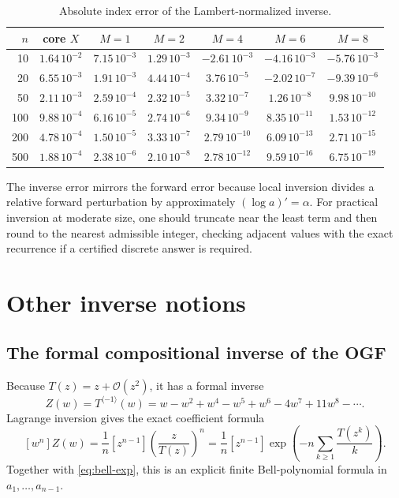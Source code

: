 \documentclass[11pt]{article}
\theoremstyle{definition}
\theoremstyle{remark}
\newcommand{\BigO}{\mathcal O}
\newcommand{\invcomp}{\langle-1\rangle}
\begin{document}
\begin{table}[htbp]
\centering
\caption{Absolute index error of the Lambert-normalized inverse.}
\label{tab:inverse-errors}
\scriptsize
\setlength{\tabcolsep}{4.6pt}
\begin{tabular}{rcccccc}
\toprule
$n$ & core $X$ & $M=1$ & $M=2$ & $M=4$ & $M=6$ & $M=8$\\
\midrule
10  & $ 1.64\,10^{-2}$ & $ 7.15\,10^{-3}$ & $ 1.29\,10^{-3}$ & $-2.61\,10^{-3}$ & $-4.16\,10^{-3}$ & $-5.76\,10^{-3}$\\
20  & $ 6.55\,10^{-3}$ & $ 1.91\,10^{-3}$ & $ 4.44\,10^{-4}$ & $ 3.76\,10^{-5}$ & $-2.02\,10^{-7}$ & $-9.39\,10^{-6}$\\
50  & $ 2.11\,10^{-3}$ & $ 2.59\,10^{-4}$ & $ 2.32\,10^{-5}$ & $ 3.32\,10^{-7}$ & $ 1.26\,10^{-8}$ & $ 9.98\,10^{-10}$\\
100 & $ 9.88\,10^{-4}$ & $ 6.16\,10^{-5}$ & $ 2.74\,10^{-6}$ & $ 9.34\,10^{-9}$ & $ 8.35\,10^{-11}$ & $ 1.53\,10^{-12}$\\
200 & $ 4.78\,10^{-4}$ & $ 1.50\,10^{-5}$ & $ 3.33\,10^{-7}$ & $ 2.79\,10^{-10}$ & $ 6.09\,10^{-13}$ & $ 2.71\,10^{-15}$\\
500 & $ 1.88\,10^{-4}$ & $ 2.38\,10^{-6}$ & $ 2.10\,10^{-8}$ & $ 2.78\,10^{-12}$ & $ 9.59\,10^{-16}$ & $ 6.75\,10^{-19}$\\
\bottomrule
\end{tabular}
\end{table}

The inverse error mirrors the forward error because local inversion divides a
relative forward perturbation by approximately $(\log a)'=\alpha$.
For practical inversion at moderate size, one should truncate near the least
term and then round to the nearest admissible integer, checking adjacent
values with the exact recurrence if a certified discrete answer is required.

\section{Other inverse notions}
\label{sec:other-inverses}

\subsection{The formal compositional inverse of the OGF}

Because $T(z)=z+\BigO(z^2)$, it has a formal inverse
\begin{equation}
 Z(w)=T^{\invcomp}(w)=w-w^2+w^4-w^5+w^6-4w^7+11w^8-\cdots.
 \label{eq:formal-ogf-inverse}
\end{equation}
Lagrange inversion gives the exact coefficient formula
\begin{equation}
 \boxed{
 [w^n]Z(w)=\frac1n[z^{n-1}]
 \left(\frac z{T(z)}\right)^n
 =\frac1n[z^{n-1}]
 \exp\!\left(-n\sum_{k\geq1}\frac{T(z^k)}{k}\right).}
 \label{eq:ogf-inverse-lagrange}
\end{equation}
Together with \cref{eq:bell-exp}, this is an explicit finite Bell-polynomial
formula in $a_1,\ldots,a_{n-1}$.
\end{document}
